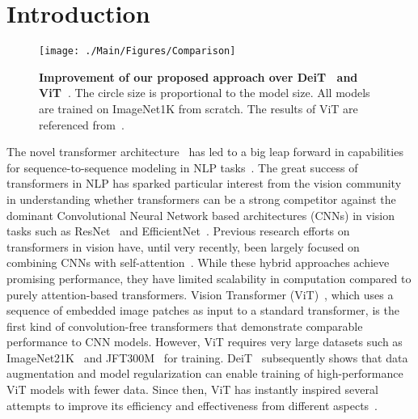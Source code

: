 \documentclass[10pt,twocolumn,letterpaper]{article}
\begin{document}
\section{Introduction}
\label{sec:intro}


\begin{figure}[tb!]
    \centering
    \texttt{[image: ./Main/Figures/Comparison]}
    \caption{\textbf{Improvement of our proposed approach over DeiT~\cite{DeiT_touvron2020} and ViT~\cite{ViT_dosovitskiy2021an}}. The circle size is proportional to the model size. All models are trained on ImageNet1K from scratch. The results of ViT are referenced from~\cite{tokenstotoken_yuan2021}.
}  
    \label{fig:perf_comp} 
\end{figure}


The novel transformer architecture~\cite{Transformer_NIPS2017_Vaswani} has led to a big leap forward in capabilities for sequence-to-sequence modeling in NLP tasks~\cite{devlin2018bert}. The great success of transformers in NLP has sparked particular interest from the vision community in understanding whether transformers can be a strong competitor against the dominant Convolutional Neural Network based architectures (CNNs) in vision tasks such as ResNet~\cite{ResNet_He_2016_CVPR} and EfficientNet~\cite{efficientnet_pmlr_tan_19}. Previous research  efforts on transformers in vision have, until very recently,  been largely focused on combining CNNs with self-attention~\cite{bello2019attention, SAN_Zhao_2020_CVPR, SASA_Ramachandran_2019_NeurIPS, BoT_srinivas2021}. While these hybrid approaches achieve promising performance, they have limited scalability in computation compared to purely attention-based transformers. Vision Transformer (ViT)~\cite{ViT_dosovitskiy2021an}, which uses a sequence of embedded image patches as input to a standard transformer, is the first kind of convolution-free transformers that demonstrate comparable performance to CNN models. However, ViT requires very large datasets such as ImageNet21K~\cite{imagenet_deng2009} and JFT300M~\cite{JFT300M_ICCV_2017} for training. DeiT~\cite{DeiT_touvron2020} subsequently shows that data augmentation and model regularization can enable training of high-performance ViT models with fewer data. Since then, ViT has instantly inspired several attempts to improve its efficiency and effectiveness from different aspects~\cite{DeiT_touvron2020, tokenstotoken_yuan2021, TNT_han2021transformer,PVT_wang2021, perceiver_jaegle2021}.
\end{document}
